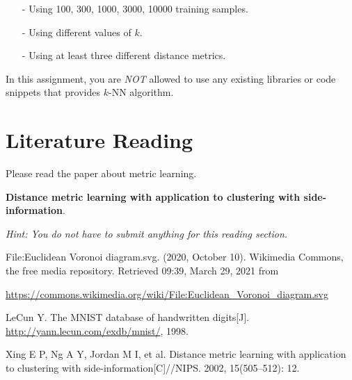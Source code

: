 \documentclass{article}
\theoremstyle{definition}
\theoremstyle{definition}
\theoremstyle{remark}
\begin{document}
\begin{enumerate}
	\item[-] Using 100, 300, 1000, 3000, 10000 training samples.
	\item[-] Using different values of $k$.
	\item[-] Using at least three different distance metrics.
\end{enumerate}

In this assignment, you are \emph{NOT} allowed to use any existing libraries or code snippets that provides $k$-NN algorithm.

\section{Literature Reading}
Please read the paper about metric learning. 

\textbf{Distance metric learning with application to clustering with side-information}.\cite{metric_learning}

\emph{Hint: You do not have to submit anything for this reading section.}


\begin{thebibliography}{1}

File:Euclidean Voronoi diagram.svg. (2020, October 10). Wikimedia Commons, the free media repository. Retrieved 09:39, March 29, 2021 from 

\url{https://commons.wikimedia.org/wiki/File:Euclidean_Voronoi_diagram.svg}

LeCun Y. The MNIST database of handwritten digits[J]. \url{http://yann.lecun.com/exdb/mnist/}, 1998.

Xing E P, Ng A Y, Jordan M I, et al. Distance metric learning with application to clustering with side-information[C]//NIPS. 2002, 15(505–512): 12.

\end{thebibliography}
\end{document}
